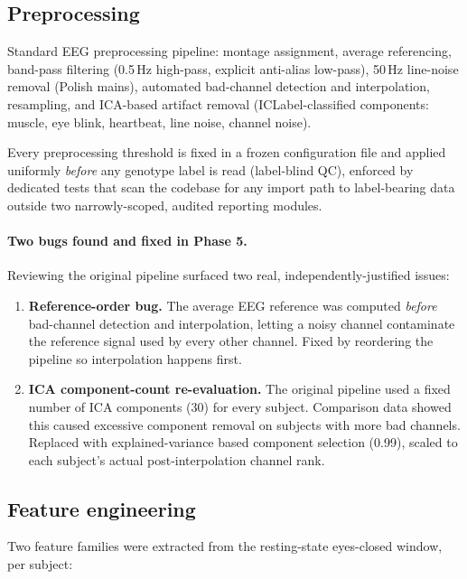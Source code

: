 \documentclass[11pt]{article}
\begin{document}
\subsection{Preprocessing}

Standard EEG preprocessing pipeline: montage assignment, average
referencing, band-pass filtering (0.5\,Hz high-pass, explicit anti-alias
low-pass), 50\,Hz line-noise removal (Polish mains), automated bad-channel
detection and interpolation, resampling, and ICA-based artifact removal
(ICLabel-classified components: muscle, eye blink, heartbeat, line noise,
channel noise).

Every preprocessing threshold is fixed in a frozen configuration file and
applied uniformly \emph{before} any genotype label is read (label-blind
QC), enforced by dedicated tests that scan the codebase for any import
path to label-bearing data outside two narrowly-scoped, audited reporting
modules.

\paragraph{Two bugs found and fixed in Phase 5.} Reviewing the original
pipeline surfaced two real, independently-justified issues:

\begin{enumerate}[leftmargin=1.2cm]
  \item \textbf{Reference-order bug.} The average EEG reference was
        computed \emph{before} bad-channel detection and interpolation,
        letting a noisy channel contaminate the reference signal used by
        every other channel. Fixed by reordering the pipeline so
        interpolation happens first.
  \item \textbf{ICA component-count re-evaluation.} The original pipeline
        used a fixed number of ICA components (30) for every subject.
        Comparison data showed this caused excessive component removal on
        subjects with more bad channels. Replaced with explained-variance
        based component selection (0.99), scaled to each subject's actual
        post-interpolation channel rank.
\end{enumerate}

\subsection{Feature engineering}

Two feature families were extracted from the resting-state eyes-closed
window, per subject:
\end{document}
